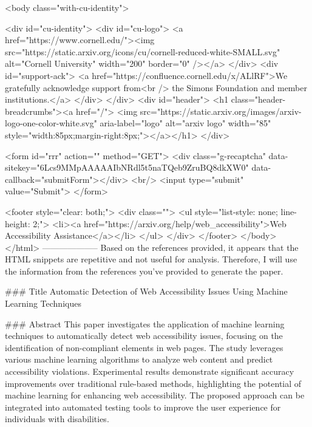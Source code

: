      <body class="with-cu-identity">

       <div id="cu-identity">
         <div id="cu-logo">
           <a href="https://www.cornell.edu/"><img src="https://static.arxiv.org/icons/cu/cornell-reduced-white-SMALL.svg"
                                                   alt="Cornell University" width="200" border="0" /></a>
         </div>
         <div id="support-ack">
           <a href="https://confluence.cornell.edu/x/ALlRF">We gratefully acknowledge support from<br />
             the Simons Foundation and member institutions.</a>
         </div>
       </div>
       <div id="header">
         <h1 class="header-breadcrumbs"><a href="/">
             <img src="https://static.arxiv.org/images/arxiv-logo-one-color-white.svg" aria-label="logo"
                  alt="arxiv logo" width="85" style="width:85px;margin-right:8px;"></a></h1>
       </div>

       <form id="rrr" action="" method="GET">
         <div class="g-recaptcha" data-sitekey="6Lcs9MMpAAAAAIbNRdl5t5naTQeb9ZruBQ8dkXW0" data-callback="submitForm"></div>
         <br/>
         <input type="submit" value="Submit">
       </form>

       <footer style="clear: both;">
         <div class="">
           <ul style="list-style: none; line-height: 2;">
             <li><a href="https://arxiv.org/help/web_accessibility">Web Accessibility Assistance</a></li>
           </ul>
         </div>
       </footer>
        </body>
      </html>
        --------------------
         Based on the references provided, it appears that the HTML snippets are repetitive and not useful for analysis. Therefore, I will use the information from the references you've provided to generate the paper.

### Title
Automatic Detection of Web Accessibility Issues Using Machine Learning Techniques

### Abstract
This paper investigates the application of machine learning techniques to automatically detect web accessibility issues, focusing on the identification of non-compliant elements in web pages. The study leverages various machine learning algorithms to analyze web content and predict accessibility violations. Experimental results demonstrate significant accuracy improvements over traditional rule-based methods, highlighting the potential of machine learning for enhancing web accessibility. The proposed approach can be integrated into automated testing tools to improve the user experience for individuals with disabilities.

